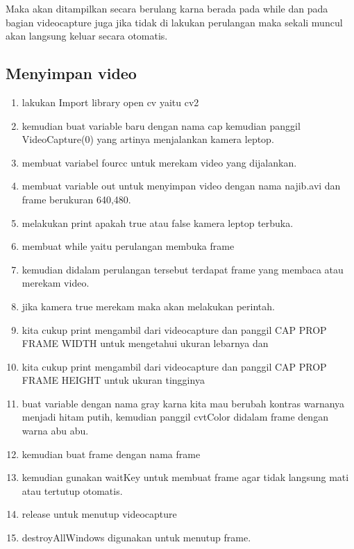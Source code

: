 Maka akan ditampilkan secara berulang karna berada pada while dan pada bagian videocapture juga jika tidak di lakukan perulangan maka sekali muncul akan langsung keluar secara otomatis.

\newpage
\subsection{Menyimpan video}

\begin{enumerate}
	\item lakukan Import library open cv yaitu cv2
	\item kemudian buat variable baru dengan nama cap kemudian panggil VideoCapture(0) yang artinya menjalankan kamera leptop.
	\item membuat variabel fourcc untuk merekam video yang dijalankan.
	\item membuat variable out untuk menyimpan video dengan nama najib.avi dan frame berukuran 640,480.
	\item melakukan print apakah true atau false kamera leptop terbuka.
	\item membuat while yaitu perulangan membuka frame
	\item kemudian didalam perulangan tersebut terdapat frame yang membaca atau merekam video.
	\item jika kamera true merekam maka akan melakukan perintah.
	\item kita cukup print mengambil dari videocapture dan panggil CAP PROP FRAME WIDTH untuk mengetahui ukuran lebarnya dan 
	\item kita cukup print mengambil dari videocapture dan panggil CAP PROP FRAME HEIGHT untuk ukuran tingginya 
	\item buat variable dengan nama gray karna kita mau berubah kontras warnanya menjadi hitam putih, kemudian panggil cvtColor didalam frame dengan warna abu abu.
	\item kemudian buat frame dengan nama frame
	\item kemudian gunakan waitKey untuk membuat frame agar tidak langsung mati atau tertutup otomatis.
	\item release untuk menutup videocapture
	\item destroyAllWindows digunakan untuk menutup frame.
\end{enumerate}

